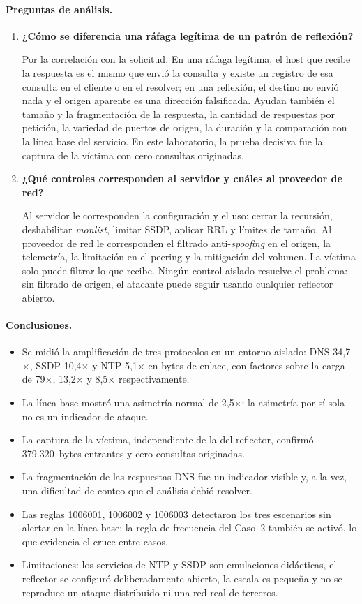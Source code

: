 \paragraph{Preguntas de análisis.}
\begin{enumerate}
	\item \textbf{¿Cómo se diferencia una ráfaga legítima de un patrón de reflexión?}\par
	Por la correlación con la solicitud. En una ráfaga legítima, el host que recibe la respuesta es el mismo que envió la consulta y existe un registro de esa consulta en el cliente o en el resolver; en una reflexión, el destino no envió nada y el origen aparente es una dirección falsificada. Ayudan también el tamaño y la fragmentación de la respuesta, la cantidad de respuestas por petición, la variedad de puertos de origen, la duración y la comparación con la línea base del servicio. En este laboratorio, la prueba decisiva fue la captura de la víctima con cero consultas originadas.
	\item \textbf{¿Qué controles corresponden al servidor y cuáles al proveedor de red?}\par
	Al servidor le corresponden la configuración y el uso: cerrar la recursión, deshabilitar \textit{monlist}, limitar SSDP, aplicar RRL y límites de tamaño. Al proveedor de red le corresponden el filtrado anti-\textit{spoofing} en el origen, la telemetría, la limitación en el peering y la mitigación del volumen. La víctima solo puede filtrar lo que recibe. Ningún control aislado resuelve el problema: sin filtrado de origen, el atacante puede seguir usando cualquier reflector abierto.
\end{enumerate}

\paragraph{Conclusiones.}
\begin{itemize}
	\item Se midió la amplificación de tres protocolos en un entorno aislado: DNS 34,7$\times$, SSDP 10,4$\times$ y NTP 5,1$\times$ en bytes de enlace, con factores sobre la carga de 79$\times$, 13,2$\times$ y 8,5$\times$ respectivamente.
	\item La línea base mostró una asimetría normal de 2,5$\times$: la asimetría por sí sola no es un indicador de ataque.
	\item La captura de la víctima, independiente de la del reflector, confirmó 379.320~bytes entrantes y cero consultas originadas.
	\item La fragmentación de las respuestas DNS fue un indicador visible y, a la vez, una dificultad de conteo que el análisis debió resolver.
	\item Las reglas 1006001, 1006002 y 1006003 detectaron los tres escenarios sin alertar en la línea base; la regla de frecuencia del Caso~2 también se activó, lo que evidencia el cruce entre casos.
	\item Limitaciones: los servicios de NTP y SSDP son emulaciones didácticas, el reflector se configuró deliberadamente abierto, la escala es pequeña y no se reproduce un ataque distribuido ni una red real de terceros.
\end{itemize}

